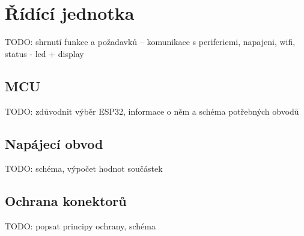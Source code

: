 \section{Řídící jednotka}
TODO: shrnutí funkce a požadavků -- komunikace s periferiemi, napajeni, wifi, status - led + display
    \subsection{MCU}
        TODO: zdůvodnit výběr ESP32, informace o něm a schéma potřebných obvodů
    \subsection{Napájecí obvod}
        TODO: schéma, výpočet hodnot součástek
    \subsection{Ochrana konektorů}
        TODO: popsat principy ochrany, schéma

